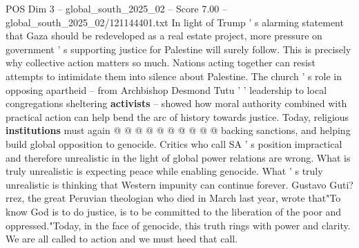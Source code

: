 \begin{textsample}{POS Dim 3 – global\_south\_2025\_02 – Score 7.00 – global\_south\_2025\_02/121144401.txt}
In light of Trump ' s alarming statement that Gaza should be redeveloped as a real estate project, more pressure on government ' s supporting justice for Palestine will surely follow.
This is precisely why collective action matters so much.
Nations acting together can resist attempts to intimidate them into silence about Palestine.
The church ' s role in opposing apartheid -- from Archbishop Desmond Tutu ' ' leadership to local congregations sheltering \textbf{activists} -- showed how moral authority combined with practical action can help bend the arc of history towards justice.
Today, religious \textbf{institutions} must again @ @ @ @ @ @ @ @ @ @ backing sanctions, and helping build global opposition to genocide.
Critics who call SA ' s position impractical and therefore unrealistic in the light of global power relations are wrong.
What is truly unrealistic is expecting peace while enabling genocide.
What ' s truly unrealistic is thinking that Western impunity can continue forever.
Gustavo Guti? rrez, the great Peruvian theologian who died in March last year, wrote that"To know God is to do justice, is to be committed to the liberation of the poor and oppressed."Today, in the face of genocide, this truth rings with power and clarity.
We are all called to action and we must heed that call.

\end{textsample}
